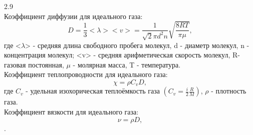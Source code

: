 \documentclass[a4paper,12pt]{article} %
\begin{document}

2.9
\\Коэффициент диффузии для идеального газа: \[ D=\frac{1}{3}<\lambda><v>=\frac{1}{\sqrt{2} \pi d^2 n} \sqrt{\frac{8 R T}{\pi \mu}},\] где <$\lambda$> - средняя длина свободного пробега молекул, d - диаметр молекул, n - концентрация молекул; <v> - средняя арифметическая скорость молекул, R-газовая постоянная, $\mu$ - молярная масса, T - температура.
\\Коэффициент теплопроводности для идеального газа: \[ \chi=\rho C_{v} D,\] где $C_{v}$ - удельная изохорическая теплоёмкость газа $(C_{v}=\frac{i}{2}\frac{R}{M})$, $\rho$ - плотность газа.
\\Коэффициент вязкости для идеального газа: \[\nu=\rho D,\].
\end{document}

